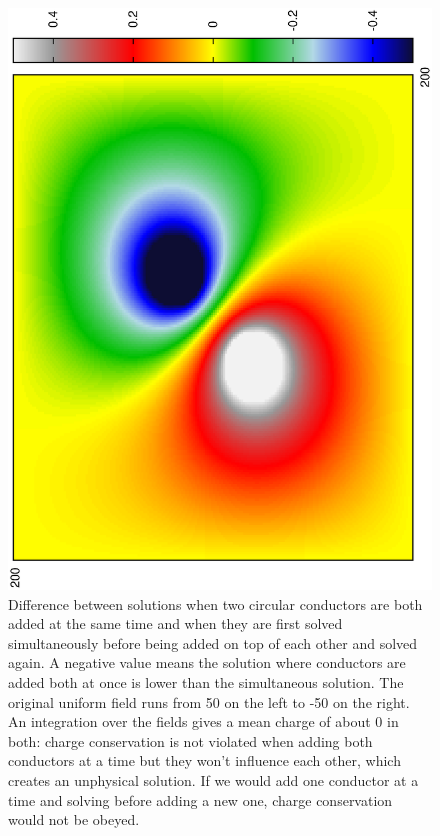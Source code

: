 \documentclass[aps,twocolumn,pre,nofootinbib,10pt]{revtex4-1}
\begin{document}
\begin{figure}
\includegraphics*[height=\breite \columnwidth,angle=270]{difference.ps} 
\caption{Difference between solutions when two circular conductors are both added at the same time and when they are first solved simultaneously before being added on top of each other and solved again. A negative value means the solution where conductors are added both at once is lower than the simultaneous solution. The original uniform field runs from 50 on the left to -50 on the right. An integration over the fields gives a mean charge of about 0 in both: charge conservation is not violated when adding both conductors at a time but they won't influence each other, which creates an unphysical solution. If we would add one conductor at a time and solving before adding a new one, charge conservation would not be obeyed.}
\label{fig:difference}
\end{figure}
\end{document}
